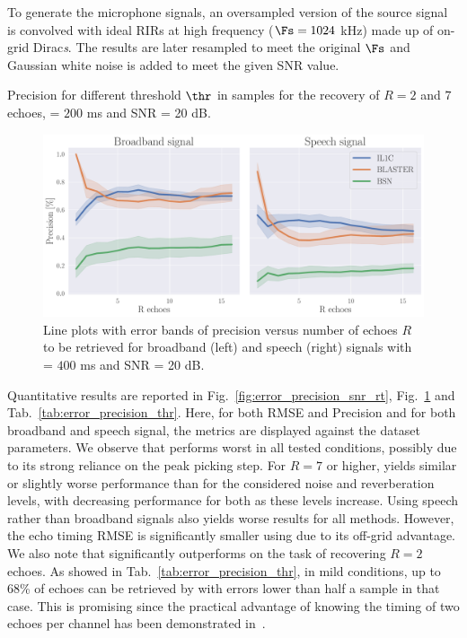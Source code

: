 To generate the microphone signals, an oversampled version of the source signal is convolved with ideal RIRs at high frequency ($\Fs=1024$ kHz) made up of on-grid Dirac\textit{s}. The results are later resampled to meet the original $\Fs$ and Gaussian white noise is added to meet the given SNR value.

\begin{table}[ht]
    \centering
    
    \caption{\label{tab:error_precision_thr} Precision for different threshold $\thr$ in samples for the recovery of $R = 2$ and $7$ echoes, \RT{} = $200$ ms and SNR = 20 dB.}
\end{table}

\begin{figure}[t!]
    \centering
        \includegraphics[width=\linewidth]{figures/blaster/p_k-7_thr-2_bns_crocco_blaster-peak_withRechoes.pdf}
        \caption{\label{fig:error_precision_kecho}  Line plots with error bands of precision versus number of echoes $R$ to be retrieved for broadband (left) and speech (right) signals with \RT{} = $400$ ms and SNR = 20 dB.}
\end{figure}

Quantitative results are reported in Fig.~\ref{fig:error_precision_snr_rt}, Fig.~\ref{fig:error_precision_kecho} and Tab.~\ref{tab:error_precision_thr}. Here, for both RMSE and Precision and for both broadband and speech signal, the metrics are displayed against the dataset parameters. We observe that \algoBsn{} performs worst in all tested conditions, possibly due to its strong reliance on the peak picking step. For $R=7$ or higher, \algoBraire{} yields similar or slightly worse performance than \algoCrocco{} for the considered noise and reverberation levels, with decreasing performance for both as these levels increase. Using speech rather than broadband signals also yields worse results for all methods. However, the echo timing RMSE is significantly smaller using \algoBraire{} due to its off-grid advantage. We also note that \algoBraire{} significantly outperforms \algoCrocco{} on the task of recovering $R=2$ echoes. As showed in Tab.~\ref{tab:error_precision_thr}, in mild conditions, up to 68\% of echoes can be retrieved by \algoBraire{} with errors lower than half a sample in that case. This is promising since the practical advantage of knowing the timing of two echoes per channel has been demonstrated in~\cite{DiCarlo2019,Scheibler2017}.